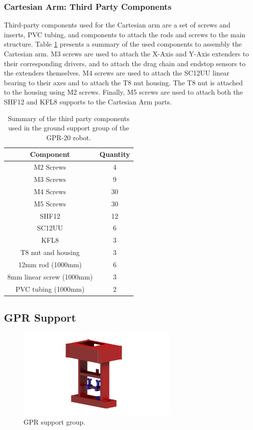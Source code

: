 \documentclass{article}
\begin{document}
\subsubsection{Cartesian Arm: Third Party Components}
Third-party components used for the Cartesian arm are a set of screws and inserts, PVC tubing, and components to attach the rods and screws to the main structure. Table \ref{tab:cartesian_third_party} presents a summary of the used components to assembly the Cartesian arm. M3 screws are used to attach the X-Axis and Y-Axis extenders to their corresponding drivers, and to attach the drag chain and endstop sensors to the extenders themselves. M4 screws are used to attach the SC12UU linear bearing to their axes and to attach the T8 nut housing. The T8 nut is attached to the housing using M2 screws. Finally, M5 screws are used to attach both the SHF12 and KFL8 supports to the Cartesian Arm parts.

\begin{table}[h]
    \centering
    \begin{tabular}{|c|c|}
        \textbf{Component} & \textbf{Quantity} \\ \hline
        M2 Screws & 4 \\
        M3 Screws & 9 \\
        M4 Screws & 30 \\
        M5 Screws & 30 \\
        SHF12 & 12 \\
        SC12UU & 6 \\
        KFL8 & 3 \\
        T8 nut and housing & 3 \\
        12mm rod (1000mm) & 6 \\
        8mm linear screw (1000mm) & 3 \\
        PVC tubing (1000mm) & 2 \\
    \end{tabular}
    \caption{Summary of the third party components used in the ground support group of the GPR-20 robot.}
    \label{tab:cartesian_third_party}
\end{table}

\subsection{GPR Support}

\begin{figure}[h]
    \centering
    \includegraphics[width=0.7\textwidth]{images/groups/vna_holder.png}
    \caption{GPR support group.}
    \label{fig:gpr_support_group}
\end{figure}
\end{document}
